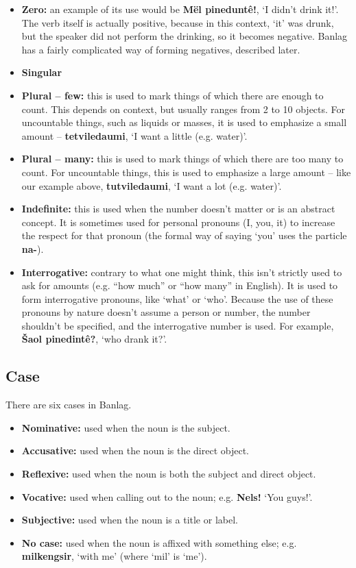 \documentclass[12pt]{report}
\begin{document}
\begin{itemize}
\item \textbf{Zero:} an example of its use would be \textbf{M\"el pinedunt\^e!}, `I didn't drink it!'. The verb itself is actually positive, because in this context, `it' was drunk, but the speaker did not perform the drinking, so it becomes negative. Banlag has a fairly complicated way of forming negatives, described later.
\item \textbf{Singular}
\item \textbf{Plural -- few:} this is used to mark things of which there are enough to count. This depends on context, but usually ranges from 2 to 10 objects. For uncountable things, such as liquids or masses, it is used to emphasize a small amount -- \textbf{tetviledaumi}, `I want a little (e.g. water)'. 
\item \textbf{Plural -- many:} this is used to mark things of which there are too many to count. For uncountable things, this is used to emphasize a large amount -- like our example above, \textbf{tutviledaumi}, `I want a lot (e.g. water)'.
\item \textbf{Indefinite:} this is used when the number doesn't matter or is an abstract concept. It is sometimes used for personal pronouns (I, you, it) to increase the respect for that pronoun (the formal way of saying `you' uses the particle \textbf{na-}).
\item \textbf{Interrogative:} contrary to what one might think, this isn't strictly used to ask for amounts (e.g. ``how much'' or ``how many'' in English). It is used to form interrogative pronouns, like `what' or `who'. Because the use of these pronouns by nature doesn't assume a person or number, the number shouldn't be specified, and the interrogative number is used. For example, \textbf{\v Saol pinedint\^e?}, `who drank it?'. 
\end{itemize}

\subsection{Case}
There are six cases in Banlag. 

\begin{itemize}
\item \textbf{Nominative:} used when the noun is the subject.
\item \textbf{Accusative:} used when the noun is the direct object.
\item \textbf{Reflexive:} used when the noun is both the subject and direct object.
\item \textbf{Vocative:} used when calling out to the noun; e.g. \textbf{Nels!} `You guys!'. 
\item \textbf{Subjective:} used when the noun is a title or label. 
\item \textbf{No case:} used when the noun is affixed with something else; e.g. \textbf{milkengsir}, `with me' (where `mil' is `me').
\end{itemize}
\end{document}
